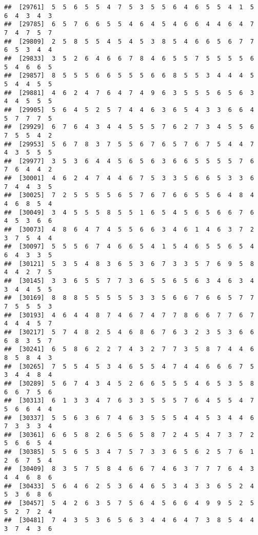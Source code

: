 \documentclass[
]{book}
\begin{document}
\begin{verbatim}
##  [29761]  5  5  6  5  5  4  7  5  3  5  5  6  4  6  5  5  4  1  5  6  4  3  4  3
##  [29785]  6  5  7  6  6  5  5  4  6  4  5  4  6  6  4  4  6  4  7  7  4  7  5  7
##  [29809]  2  5  8  5  5  4  5  4  5  3  8  5  4  6  6  5  6  7  7  6  5  3  4  4
##  [29833]  3  5  2  6  4  6  6  7  8  4  6  5  5  7  5  5  5  5  6  5  4  6  6  5
##  [29857]  8  5  5  5  6  6  5  5  5  6  6  8  5  5  3  4  4  4  5  5  4  4  5  5
##  [29881]  4  6  2  4  7  6  4  7  4  9  6  3  5  5  5  6  5  6  3  4  4  5  5  5
##  [29905]  5  6  4  5  2  5  7  4  4  6  3  6  5  4  3  3  6  6  4  5  7  7  7  5
##  [29929]  6  7  6  4  3  4  4  5  5  5  7  6  2  7  3  4  5  5  6  7  5  5  4  2
##  [29953]  5  6  7  8  3  7  5  5  6  7  6  5  7  6  7  5  4  4  7  4  3  5  5  5
##  [29977]  3  5  3  6  4  4  5  6  5  6  3  6  6  5  5  5  5  7  6  7  6  4  4  2
##  [30001]  4  6  2  4  7  4  4  6  7  5  3  3  5  6  6  5  3  3  6  7  4  4  3  5
##  [30025]  7  2  5  5  5  5  6  5  7  6  7  6  6  5  5  6  4  8  4  4  6  8  5  4
##  [30049]  3  4  5  5  5  8  5  5  1  6  5  4  5  6  5  6  6  7  6  4  5  3  6  6
##  [30073]  4  8  6  4  7  4  5  5  6  6  3  4  6  1  4  6  3  7  2  3  7  5  4  4
##  [30097]  5  5  5  6  7  4  6  6  5  4  1  5  4  6  5  5  6  5  4  6  4  3  3  5
##  [30121]  5  3  5  4  8  3  6  5  3  6  7  3  3  5  7  6  9  5  8  4  4  2  7  5
##  [30145]  3  3  6  5  5  7  7  3  6  5  5  6  5  6  3  4  6  3  4  3  4  4  5  5
##  [30169]  8  8  8  5  5  5  5  5  3  3  5  6  6  7  6  6  5  7  7  7  5  5  5  3
##  [30193]  4  6  4  4  8  7  4  6  7  4  7  7  8  6  6  7  7  6  7  4  4  4  5  7
##  [30217]  5  7  4  8  2  5  4  6  8  6  7  6  3  2  3  5  3  6  6  6  8  3  5  7
##  [30241]  6  5  8  6  2  2  7  4  3  2  7  7  3  5  8  7  4  4  6  8  5  8  4  3
##  [30265]  7  5  5  4  5  3  4  6  5  5  4  7  4  4  6  6  6  7  5  3  4  4  8  4
##  [30289]  5  6  7  4  3  4  5  2  6  6  5  5  5  4  6  5  3  5  8  6  6  7  5  6
##  [30313]  6  1  3  3  4  7  6  3  3  5  5  5  7  6  4  5  5  4  7  5  6  6  4  4
##  [30337]  5  5  6  3  6  7  4  6  3  5  5  5  4  4  5  3  4  4  6  7  3  3  3  4
##  [30361]  6  6  5  8  2  6  5  6  5  8  7  2  4  5  4  7  3  7  2  5  6  6  5  4
##  [30385]  5  5  6  5  3  4  7  5  7  3  3  6  5  6  2  5  7  6  1  2  6  7  5  4
##  [30409]  8  3  5  7  5  8  4  6  6  7  4  6  3  7  7  7  6  4  3  4  4  6  8  6
##  [30433]  5  6  4  6  2  5  3  6  4  6  5  3  4  3  3  6  5  2  4  5  3  6  8  6
##  [30457]  5  4  2  6  3  5  7  5  6  4  5  6  6  4  9  9  5  2  5  5  2  7  2  4
##  [30481]  7  4  3  5  3  6  5  6  3  4  4  6  4  7  3  8  5  4  4  3  7  4  3  6

\end{verbatim}
\end{document}
